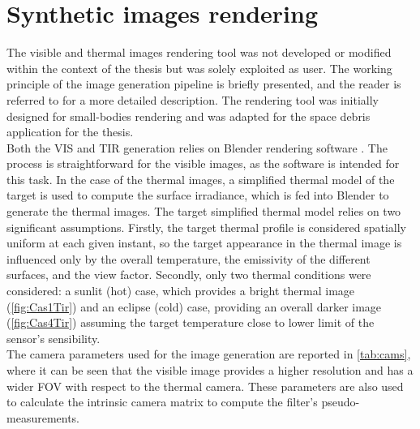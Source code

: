 \section{Synthetic images rendering}
\label{sec:rendering}
The visible and thermal images rendering tool was not developed or modified within the context of the thesis but was solely exploited as user. The working principle of the image generation pipeline is briefly presented, and the reader is referred to \cite{piccinin2023spacecraft} for a more detailed description. The rendering tool was initially designed for small-bodies rendering and was adapted for the space debris application for the thesis. \\
Both the VIS and TIR generation relies on Blender rendering software \cite{blender}. The process is straightforward for the visible images, as the software is intended for this task. In the case of the thermal images, a simplified thermal model of the target is used to compute the surface irradiance, which is fed into Blender to generate the thermal images. The target simplified thermal model relies on two significant assumptions. Firstly, the target thermal profile is considered spatially uniform at each given instant, so the target appearance in the thermal image is influenced only by the overall temperature, the emissivity of the different surfaces, and the view factor. Secondly, only two thermal conditions were considered: a sunlit (hot) case, which provides a bright thermal image (\cref{fig:Cas1Tir}) and an eclipse (cold) case, providing an overall darker image (\cref{fig:Cas4Tir}) assuming the target temperature close to lower limit of the sensor's sensibility. \\
The camera parameters used for the image generation are reported in \cref{tab:cams}, where it can be seen that the visible image provides a higher resolution and has a wider FOV with respect to the thermal camera.  These parameters are also used to calculate the intrinsic camera matrix to compute the filter's pseudo-measurements.\\

